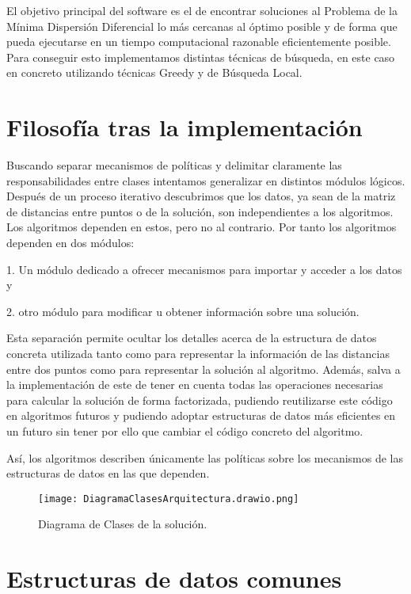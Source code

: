El objetivo principal del software es el de encontrar soluciones al Problema de la Mínima Dispersión Diferencial lo más cercanas
al óptimo posible y de forma que pueda ejecutarse en un tiempo computacional razonable eficientemente posible. Para conseguir esto
implementamos distintas técnicas de búsqueda, en este caso en concreto utilizando técnicas Greedy y de Búsqueda Local.

\section{Filosofía tras la implementación}

Buscando separar mecanismos de políticas y delimitar claramente las responsabilidades entre clases intentamos generalizar en
distintos módulos lógicos. Después de un proceso iterativo descubrimos que los datos, ya sean de la matriz de distancias
entre puntos o de la solución, son independientes a los algoritmos.
Los algoritmos dependen en estos, pero no al contrario. Por tanto los algoritmos dependen en dos módulos:

    1. Un módulo dedicado a ofrecer mecanismos para importar y acceder a los datos y
    
    2. otro módulo para modificar u obtener información sobre una solución.

Esta separación permite ocultar los detalles acerca de la estructura de datos concreta utilizada tanto como para representar
la información de las distancias entre dos puntos como para representar
la solución al algoritmo. Además, salva a la implementación de este de tener en cuenta todas las operaciones necesarias
para calcular la solución de forma factorizada, pudiendo reutilizarse este código en algoritmos futuros y pudiendo adoptar estructuras
de datos más eficientes en un futuro sin tener por ello que cambiar el código concreto del algoritmo.

Así, los algoritmos describen únicamente las políticas sobre los mecanismos de las estructuras de datos en las que dependen.

\begin{figure}[ht]
    \centering
    \texttt{[image: DiagramaClasesArquitectura.drawio.png]}
    \caption{Diagrama de Clases de la solución.}
\end{figure}

\section{Estructuras de datos comunes}

